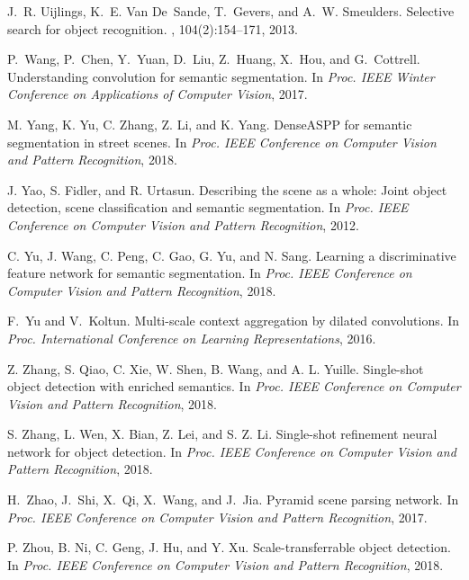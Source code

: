 \documentclass[10pt,twocolumn,letterpaper]{article}
\begin{document}
\begin{thebibliography}{10}
J.~R. Uijlings, K.~E. Van De~Sande, T.~Gevers, and A.~W. Smeulders.
\newblock Selective search for object recognition.
, 104(2):154--171, 2013.

P.~Wang, P.~Chen, Y.~Yuan, D.~Liu, Z.~Huang, X.~Hou, and G.~Cottrell.
\newblock Understanding convolution for semantic segmentation.
\newblock In {\em Proc. IEEE Winter Conference on Applications of Computer Vision},  2017.

M. Yang, K. Yu, C. Zhang, Z. Li, and K. Yang.
DenseASPP for semantic segmentation in street scenes.
\newblock In {\em Proc. IEEE Conference on Computer Vision and Pattern Recognition},  2018.

J. Yao, S. Fidler, and R. Urtasun. 
\newblock Describing the scene as a whole: Joint object detection, scene classification and semantic segmentation. 
\newblock In {\em Proc. IEEE Conference on Computer Vision and Pattern Recognition}, 2012.

C. Yu, J. Wang, C. Peng, C. Gao, G. Yu, and N. Sang.
Learning a discriminative feature network for semantic segmentation.
\newblock In {\em Proc. IEEE Conference on Computer Vision and Pattern Recognition},  2018.

F.~Yu and V.~Koltun.
\newblock Multi-scale context aggregation by dilated convolutions.
\newblock In {\em Proc. International Conference on Learning Representations}, 2016.

Z. Zhang, S. Qiao, C. Xie, W. Shen, B. Wang, and A. L. Yuille.
Single-shot object detection with enriched semantics.
\newblock In {\em Proc. IEEE Conference on Computer Vision and Pattern Recognition},  2018.

S. Zhang, L. Wen, X. Bian, Z. Lei, and S. Z. Li.
Single-shot refinement neural network for object detection.
\newblock In {\em Proc. IEEE Conference on Computer Vision and Pattern Recognition},  2018.
  
H.~Zhao, J.~Shi, X.~Qi, X.~Wang, and J.~Jia.
\newblock Pyramid scene parsing network.
\newblock In {\em Proc. IEEE Conference on Computer Vision and Pattern Recognition},  2017.

P. Zhou, B. Ni, C. Geng, J. Hu, and Y. Xu.
Scale-transferrable object detection.
\newblock In {\em Proc. IEEE Conference on Computer Vision and Pattern Recognition},  2018.


\end{thebibliography}
\end{document}
